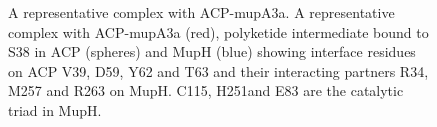 			\setlength\fboxsep{5pt}
			\setlength\fboxrule{1.5pt}
			\begin{figure} [h!]
			\centering
			\caption[A representative complex with ACP-mupA3a.]{A representative complex with ACP-mupA3a. A representative complex with ACP-mupA3a (red), polyketide intermediate bound to S38 in ACP (spheres) and MupH (blue) showing interface residues on ACP V39, D59, Y62 and T63 and their interacting partners R34, M257 and R263 on MupH. C115, H251and E83 are the catalytic triad in MupH.}
			\label{fig:repcomplex}
			\end{figure}				

